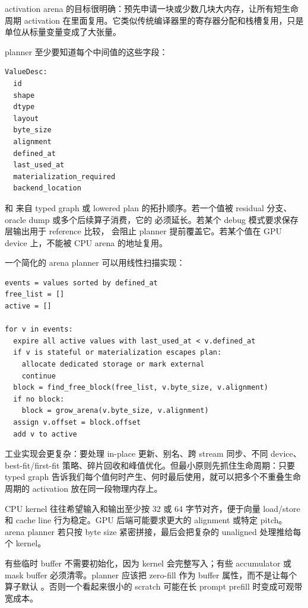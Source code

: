 activation arena 的目标很明确：预先申请一块或少数几块大内存，让所有短生命周期 activation 在里面复用。它类似传统编译器里的寄存器分配和栈槽复用，只是单位从标量变量变成了大张量。

planner 至少要知道每个中间值的这些字段：

\begin{lstlisting}[numbers=none,caption={arena planner 使用的 value descriptor}]
ValueDesc:
  id
  shape
  dtype
  layout
  byte_size
  alignment
  defined_at
  last_used_at
  materialization_required
  backend_location
\end{lstlisting}

 和  来自 typed graph 或 lowered plan 的拓扑顺序。若一个值被 residual 分支、oracle dump 或多个后续算子消费，它的  必须延长。若某个 debug 模式要求保存层输出用于 reference 比较， 会阻止 planner 提前覆盖它。若某个值在 GPU device 上，不能被 CPU arena 的地址复用。

一个简化的 arena planner 可以用线性扫描实现：

\begin{lstlisting}[numbers=none,caption={线性扫描式 activation arena 规划}]
events = values sorted by defined_at
free_list = []
active = []

for v in events:
  expire all active values with last_used_at < v.defined_at
  if v is stateful or materialization escapes plan:
    allocate dedicated storage or mark external
    continue
  block = find_free_block(free_list, v.byte_size, v.alignment)
  if no block:
    block = grow_arena(v.byte_size, v.alignment)
  assign v.offset = block.offset
  add v to active
\end{lstlisting}

工业实现会更复杂：要处理 in-place 更新、别名、跨 stream 同步、不同 device、best-fit/first-fit 策略、碎片回收和峰值优化。但最小原则先抓住生命周期：只要 typed graph 告诉我们每个值何时产生、何时最后使用，就可以把多个不重叠生命周期的 activation 放在同一段物理内存上。

 CPU kernel 往往希望输入和输出至少按 32 或 64 字节对齐，便于向量 load/store 和 cache line 行为稳定。GPU 后端可能要求更大的 alignment 或特定 pitch。arena planner 若只按 byte size 紧密拼接，最后会把复杂的 unaligned 处理推给每个 kernel。

 有些临时 buffer 不需要初始化，因为 kernel 会完整写入；有些 accumulator 或 mask buffer 必须清零。planner 应该把 zero-fill 作为 buffer 属性，而不是让每个算子默认 。否则一个看起来很小的 scratch 可能在长 prompt prefill 时变成可观带宽成本。


